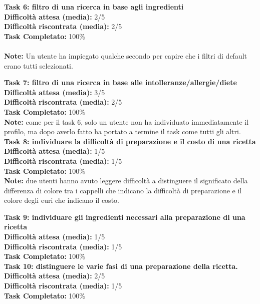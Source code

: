 \begin{itemize}
\textbf{Task 6: filtro di una ricerca in base agli ingredienti}\\
\textbf{Difficoltà attesa (media):} 2/5\\
\textbf{Difficoltà riscontrata (media):} 2/5\\
\textbf{Task Completato:} 100\%\\\\
\textbf{Note:} Un utente ha impiegato qualche secondo per capire che i
filtri di default erano tutti selezionati.

\textbf{Task 7: filtro di una ricerca in base alle intolleranze/allergie/diete}\\
\textbf{Difficoltà attesa (media):} 3/5\\
\textbf{Difficoltà riscontrata (media):} 2/5\\
\textbf{Task Completato:} 100\%\\
\textbf{Note:} come per il task 6, solo un utente non ha individuato immediatamente il
profilo, ma dopo averlo fatto ha portato a termine il task come tutti
gli altri.\\

\textbf{Task 8: individuare la difficoltà di preparazione e il costo di una ricetta}\\
\textbf{Difficoltà attesa (media):} 1/5\\
\textbf{Difficoltà riscontrata (media):} 1/5\\
\textbf{Task Completato:} 100\%\\
\textbf{Note:} due utenti hanno avuto leggere difficoltà a distinguere
il significato della differenza di colore tra i cappelli che indicano la
difficoltà di preparazione e il colore degli euri che indicano il
costo.

\textbf{Task 9: individuare gli ingredienti necessari alla preparazione
di una ricetta}\\
\textbf{Difficoltà attesa (media):} 1/5\\
\textbf{Difficoltà riscontrata (media):} 1/5\\
\textbf{Task Completato:} 100\%\\

\textbf{Task 10: distinguere le varie fasi di una preparazione della
ricetta.}\\
\textbf{Difficoltà attesa (media):} 2/5\\
\textbf{Difficoltà riscontrata (media):} 1/5\\
\textbf{Task Completato:} 100\%\\


\end{itemize}
